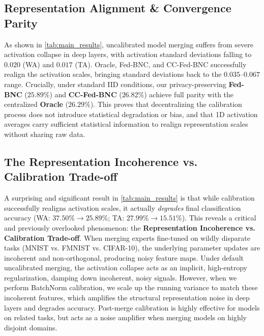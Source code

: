 \documentclass{article}
\theoremstyle{plain}
\theoremstyle{definition}
\theoremstyle{remark}
\begin{document}
\subsection{Representation Alignment \& Convergence Parity}
As shown in \cref{tab:main_results}, uncalibrated model merging suffers from severe activation collapse in deep layers, with activation standard deviations falling to $0.020$ (WA) and $0.017$ (TA). Oracle, Fed-BNC, and CC-Fed-BNC successfully realign the activation scales, bringing standard deviations back to the $0.035$--$0.067$ range. Crucially, under standard IID conditions, our privacy-preserving \textbf{Fed-BNC} ($25.89\%$) and \textbf{CC-Fed-BNC} ($26.82\%$) achieve full parity with the centralized \textbf{Oracle} ($26.29\%$). This proves that decentralizing the calibration process does not introduce statistical degradation or bias, and that 1D activation averages carry sufficient statistical information to realign representation scales without sharing raw data.

\subsection{The Representation Incoherence vs. Calibration Trade-off}
\label{subsec:tradeoff}
A surprising and significant result in \cref{tab:main_results} is that while calibration successfully realigns activation scales, it actually \textit{degrades} final classification accuracy (WA: $37.50\% \to 25.89\%$; TA: $27.99\% \to 15.51\%$). This reveals a critical and previously overlooked phenomenon: the \textbf{Representation Incoherence vs. Calibration Trade-off}. When merging experts fine-tuned on wildly disparate tasks (MNIST vs. FMNIST vs. CIFAR-10), the underlying parameter updates are incoherent and non-orthogonal, producing noisy feature maps. Under default uncalibrated merging, the activation collapse acts as an implicit, high-entropy regularization, damping down incoherent, noisy signals. However, when we perform BatchNorm calibration, we scale up the running variance to match these incoherent features, which amplifies the structural representation noise in deep layers and degrades accuracy. Post-merge calibration is highly effective for models on related tasks, but acts as a noise amplifier when merging models on highly disjoint domains.
\end{document}
